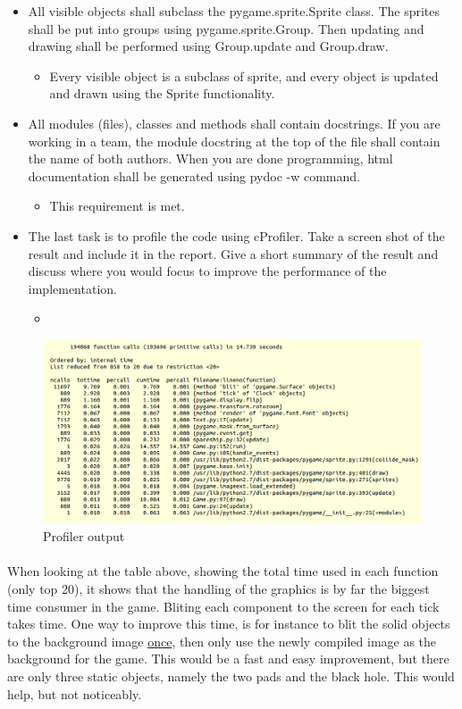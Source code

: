 \documentclass{article}
\begin{document}
\begin{itemize}
\begin{itemize}
	\end{itemize}
	\item All visible objects shall subclass the pygame.sprite.Sprite class. The sprites shall be put into groups using pygame.sprite.Group. Then updating and drawing shall be performed using Group.update and Group.draw. 
	\begin{itemize}
		\item Every visible object is a subclass of sprite, and every object is updated and drawn using the Sprite functionality.
	\end{itemize}
	\item All modules (files), classes and methods shall contain docstrings. If you are working in a team, the module docstring at the top of the file shall contain the name of both authors. When you are done programming, html documentation shall be generated using pydoc -w command.
	\begin{itemize}
		\item This requirement is met.
	\end{itemize}
	\item The last task is to profile the code using cProfiler. Take a screen shot of the result and include it in the report. Give a short summary of the result and discuss where you would focus to improve the performance of the implementation.
	\begin{itemize}
		\item 
	\end{itemize}
\end{itemize}

\begin{figure}
\caption{Profiler output}
\centering
\includegraphics[scale=0.45]{profileing.png}
\end{figure}

\paragraph{}
When looking at the table above, showing the total time used in each function (only top 20), it shows that the handling of the graphics is by far the biggest time consumer in the game. Bliting each component to the screen for each tick takes time. One way to improve this time, is for instance to blit the solid objects to the background image \underline{once}, then only use the newly compiled image as the background for the game. This would be a fast and easy improvement, but there are only three static objects, namely the two pads and the black hole. This would help, but not noticeably.
\end{document}
